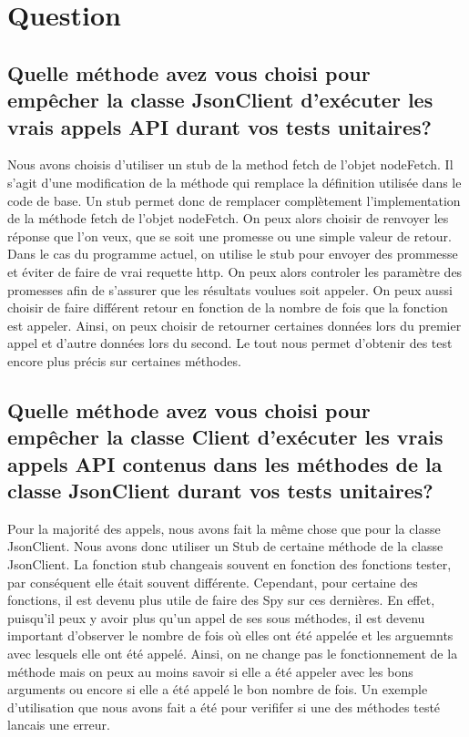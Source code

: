 \documentclass{article}
\begin{document}
\section*{Question}
\subsection*{Quelle méthode avez vous choisi pour empêcher la classe JsonClient d’exécuter
  les vrais appels API durant vos tests unitaires?}
Nous avons choisis d'utiliser un stub de la method fetch de l'objet nodeFetch.
Il s'agit d'une modification de la méthode qui remplace la définition utilisée dans le code de base.
Un stub permet donc de remplacer complètement l'implementation de la méthode fetch de l'objet nodeFetch.
On peux alors choisir de renvoyer les réponse que l'on veux, que se soit une promesse ou une simple valeur de retour.
Dans le cas du programme actuel, on utilise le stub pour envoyer des prommesse et éviter de faire de vrai requette http.
On peux alors controler les paramètre des promesses afin de s'assurer que les résultats voulues soit appeler.
On peux aussi choisir de faire différent retour en fonction de la nombre de fois que la fonction est appeler.
Ainsi, on peux choisir de retourner certaines données lors du premier appel et d'autre données lors du second.
Le tout nous permet d'obtenir des test encore plus précis sur certaines méthodes.
\subsection*{Quelle méthode avez vous choisi pour empêcher la classe Client d’exécuter les
  vrais appels API contenus dans les méthodes de la classe JsonClient durant
  vos tests unitaires?}
Pour la majorité des appels, nous avons fait la même chose que pour la classe JsonClient.
Nous avons donc utiliser un Stub de certaine méthode de la classe JsonClient.
La fonction stub changeais souvent en fonction des fonctions tester, par conséquent elle était souvent différente.
Cependant, pour certaine des fonctions, il est devenu plus utile de faire des Spy sur ces dernières.
En effet, puisqu'il peux y avoir plus qu'un appel de ses sous méthodes, il est devenu important d'observer le nombre de fois où elles ont été appelée et les arguemnts avec lesquels elle ont été appelé.
Ainsi, on ne change pas le fonctionnement de la méthode mais on peux au moins savoir si elle a été appeler avec les bons arguments ou encore si elle a été appelé le bon nombre de fois.
Un exemple d'utilisation que nous avons fait a été pour verififer si une des méthodes testé lancais une erreur.
\end{document}
